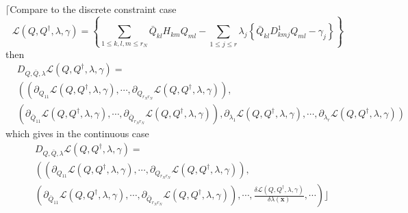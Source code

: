 \documentclass[aps,preprint]{revtex4}%
\begin{document}
$\lceil$Compare to the discrete constraint case
\begin{equation}
\mathcal{L}\left(  Q,Q^{\dagger},\lambda,\gamma\right)  =\left\{  \sum_{1\leq
k,l,m\leq r_{N}}\bar{Q}_{kl}H_{km}Q_{ml}-\sum_{1\leq j\leq r}\lambda
_{j}\left\{  \bar{Q}_{kl}D_{kmj}^{1}Q_{ml}-\gamma_{j}\right\}  \right\}
\end{equation}
then
\begin{align}
&  D_{Q,\bar{Q},\lambda}\mathcal{L}\left(  Q,Q^{\dagger},\lambda
,\gamma\right)  =\nonumber\\
&  \left(  \left(  \partial_{Q_{11}}\mathcal{L}\left(  Q,Q^{\dagger}%
,\lambda,\gamma\right)  ,\cdots,\partial_{Q_{r_{N}r_{N}}}\mathcal{L}\left(
Q,Q^{\dagger},\lambda,\gamma\right)  \right)  ,\right.  \nonumber\\
&  \left(  \partial_{\bar{Q}_{11}}\mathcal{L}\left(  Q,Q^{\dagger}%
,\lambda,\gamma\right)  ,\cdots,\partial_{\bar{Q}_{r_{N}r_{N}}}\mathcal{L}%
\left(  Q,Q^{\dagger},\lambda,\gamma\right)  \right)  ,\left.  \partial
_{\lambda_{1}}\mathcal{L}\left(  Q,Q^{\dagger},\lambda,\gamma\right)
,\cdots,\partial_{\lambda_{r}}\mathcal{L}\left(  Q,Q^{\dagger},\lambda
,\gamma\right)  \right)
\end{align}
which gives in the continuous case
\begin{align}
&  D_{Q,\bar{Q},\lambda}\mathcal{L}\left(  Q,Q^{\dagger},\lambda
,\gamma\right)  =\nonumber\\
&  \left(  \left(  \partial_{Q_{11}}\mathcal{L}\left(  Q,Q^{\dagger}%
,\lambda,\gamma\right)  ,\cdots,\partial_{Q_{r_{N}r_{N}}}\mathcal{L}\left(
Q,Q^{\dagger},\lambda,\gamma\right)  \right)  \right.  ,\nonumber\\
&  \left(  \partial_{\bar{Q}_{11}}\mathcal{L}\left(  Q,Q^{\dagger}%
,\lambda,\gamma\right)  ,\cdots,\partial_{\bar{Q}_{r_{N}r_{N}}}\mathcal{L}%
\left(  Q,Q^{\dagger},\lambda,\gamma\right)  \right)  ,\left.  \cdots
,\frac{\delta\mathcal{L}\left(  Q,Q^{\dagger},\lambda,\gamma\right)  }%
{\delta\lambda\left(  \mathbf{x}\right)  },\cdots\right)  \rfloor
\end{align}
\end{document}
